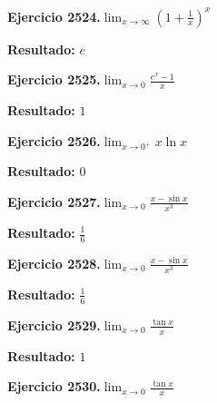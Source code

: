 \documentclass[10pt,a4paper]{article}
\begin{document}
\begin{ejbox}
\textbf{Ejercicio 2524.}\quad $\lim_{x\to \infty} \left(1+\frac{1}{x}\right)^x$
\end{ejbox}

\begin{solbox}
\textbf{Resultado:} \(\displaystyle e\)
\end{solbox}

\begin{ejbox}
\textbf{Ejercicio 2525.}\quad $\lim_{x\to 0} \frac{e^x-1}{x}$
\end{ejbox}

\begin{solbox}
\textbf{Resultado:} \(\displaystyle 1\)
\end{solbox}

\newpage
\begin{ejbox}
\textbf{Ejercicio 2526.}\quad $\lim_{x\to 0^+} x\ln x$
\end{ejbox}

\begin{solbox}
\textbf{Resultado:} \(\displaystyle 0\)
\end{solbox}

\begin{ejbox}
\textbf{Ejercicio 2527.}\quad $\lim_{x\to 0} \frac{x-\sin x}{x^3}$
\end{ejbox}

\begin{solbox}
\textbf{Resultado:} \(\displaystyle \frac{1}{6}\)
\end{solbox}

\begin{ejbox}
\textbf{Ejercicio 2528.}\quad $\lim_{x\to 0} \frac{x-\sin x}{x^3}$
\end{ejbox}

\begin{solbox}
\textbf{Resultado:} \(\displaystyle \frac{1}{6}\)
\end{solbox}

\newpage
\begin{ejbox}
\textbf{Ejercicio 2529.}\quad $\lim_{x\to 0} \frac{\tan x}{x}$
\end{ejbox}

\begin{solbox}
\textbf{Resultado:} \(\displaystyle 1\)
\end{solbox}

\begin{ejbox}
\textbf{Ejercicio 2530.}\quad $\lim_{x\to 0} \frac{\tan x}{x}$
\end{ejbox}
\end{document}
